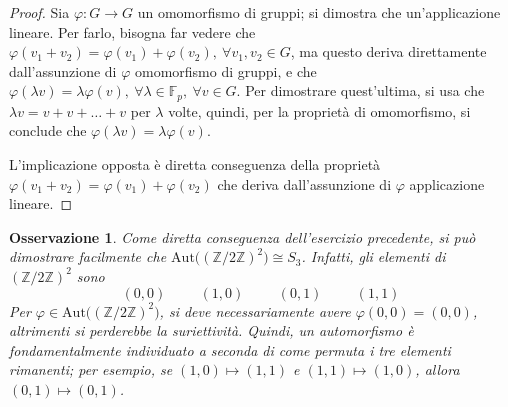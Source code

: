 \documentclass[11pt]{scrartcl}
\theoremstyle{style}
\newtheorem{osservazione}{Osservazione}[section]
\numberwithin{equation}{subsection}
\begin{document}
\begin{proof}
	Sia $\varphi  : G \to G$ un omomorfismo di gruppi; si dimostra che un'applicazione lineare.
	Per farlo, bisogna far vedere che $\varphi (v_1+v_2) = \varphi (v_1) + \varphi (v_2), \ \forall v_1,v_2 \in G$, ma questo deriva direttamente dall'assunzione di $\varphi $ omomorfismo di gruppi, e che $\varphi (\lambda v) = \lambda \varphi (v), \ \forall \lambda \in \mathbb{F}_p, \ \forall v \in G$.
	Per dimostrare quest'ultima, si usa che $\lambda v = v + v + \ldots +v $ per $\lambda $ volte, quindi, per la propriet\`a di omomorfismo, si conclude che $\varphi (\lambda v) = \lambda \varphi (v)$.

	L'implicazione opposta \`e diretta conseguenza della propriet\`a $\varphi (v_1+v_2) = \varphi (v_1)+\varphi (v_2)$ che deriva dall'assunzione di $\varphi $ applicazione lineare.
\end{proof}
\begin{osservazione}
Come diretta conseguenza dell'esercizio precedente, si pu\`o dimostrare facilmente che $\mathrm{Aut} \big((\mathbb{Z}/2\mathbb{Z})^2\big) \cong S_3$.
Infatti, gli elementi di $(\mathbb{Z}/2\mathbb{Z})^2$ sono 
\[
	(0,0) \hspace{1cm} (1,0) \hspace{1cm}(0,1) \hspace{1cm}(1,1)
\] 
Per $\varphi  \in\mathrm{Aut} \big((\mathbb{Z}/2\mathbb{Z})^2\big) $, si deve necessariamente avere $\varphi (0,0) = (0,0)$, altrimenti si perderebbe la suriettivit\`a.
Quindi, un automorfismo \`e fondamentalmente individuato a seconda di come permuta i tre elementi rimanenti; per esempio, se $(1,0) \mapsto (1,1)$ e $(1,1) \mapsto (1,0)$, allora $(0,1) \mapsto (0,1)$.
\end{osservazione}
\end{document}
